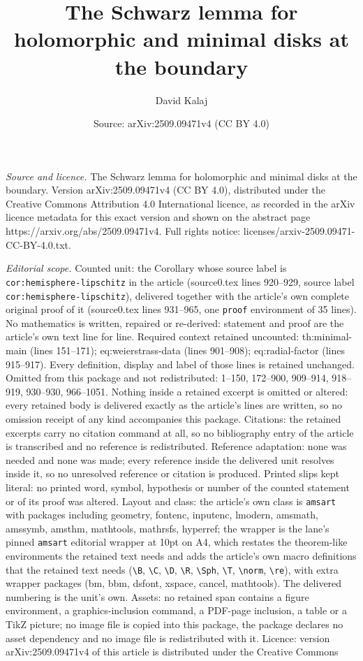 \documentclass[10pt,a4paper]{amsart}
\title[The Schwarz lemma for holomorphic and minimal disks at the b]{The Schwarz lemma for holomorphic and minimal disks at the boundary}
\author{David Kalaj}
\date{Source: arXiv:2509.09471v4 (CC BY 4.0)}
\begin{document}
\maketitle

\noindent\emph{Source and licence.} The Schwarz lemma for holomorphic and minimal disks at the boundary. Version arXiv:2509.09471v4 (CC BY 4.0), distributed under the Creative Commons Attribution 4.0 International licence, as recorded in the arXiv licence metadata for this exact version and shown on the abstract page https://arxiv.org/abs/2509.09471v4. Full rights notice: licenses/arxiv-2509.09471-CC-BY-4.0.txt.\par\smallskip

\noindent\textit{Editorial scope.} Counted unit: the Corollary whose source label is \texttt{cor:hemisphere-lipschitz} in the article (source0.tex lines 920--929, source label \texttt{cor:hemisphere-lipschitz}), delivered together with the article's own complete original proof of it (source0.tex lines 931--965, one \texttt{proof} environment of 35 lines). No mathematics is written, repaired or re-derived: statement and proof are the article's own text line for line. Required context retained uncounted: th:minimal-main (lines 151--171); eq:weierstrass-data (lines 901--908); eq:radial-factor (lines 915--917). Every definition, display and label of those lines is retained unchanged. Omitted from this package and not redistributed: 1--150, 172--900, 909--914, 918--919, 930--930, 966--1051. Nothing inside a retained excerpt is omitted or altered: every retained body is delivered exactly as the article's lines are written, so no omission receipt of any kind accompanies this package. Citations: the retained excerpts carry no citation command at all, so no bibliography entry of the article is transcribed and no reference is redistributed. Reference adaptation: none was needed and none was made; every reference inside the delivered unit resolves inside it, so no unresolved reference or citation is produced. Printed slips kept literal: no printed word, symbol, hypothesis or number of the counted statement or of its proof was altered. Layout and class: the article's own class is \texttt{amsart} with packages including geometry, fontenc, inputenc, lmodern, amsmath, amssymb, amsthm, mathtools, mathrsfs, hyperref; the wrapper is the lane's pinned \texttt{amsart} editorial wrapper at 10pt on A4, which restates the theorem-like environments the retained text needs and adds the article's own macro definitions that the retained text needs (\texttt{\textbackslash B}, \texttt{\textbackslash C}, \texttt{\textbackslash D}, \texttt{\textbackslash R}, \texttt{\textbackslash Sph}, \texttt{\textbackslash T}, \texttt{\textbackslash norm}, \texttt{\textbackslash re}), with extra wrapper packages (bm, bbm, dsfont, xspace, cancel, mathtools). The delivered numbering is the unit's own. Assets: no retained span contains a figure environment, a graphics-inclusion command, a PDF-page inclusion, a table or a TikZ picture; no image file is copied into this package, the package declares no asset dependency and no image file is redistributed with it. Licence: version arXiv:2509.09471v4 of this article is distributed under the Creative Commons 
\end{document}
